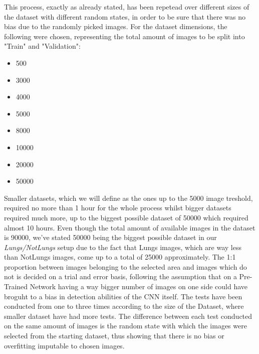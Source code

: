 \documentclass[../main.tex]{subfiles}
\begin{document}

This process, exactly as already stated, has been repetead over different sizes of the dataset with different random states, in order to be sure that there was no bias due to the randomly picked images. For the dataset dimensions, the following were chosen, representing the total amount of images to be split into "Train" and "Validation":
\begin{itemize}
	\item 500
	\item 3000
	\item 4000
	\item 5000
	\item 8000
	\item 10000
	\item 20000
	\item 50000
\end{itemize}

Smaller datasets, which we will define as the ones up to the 5000 image treshold, required no more than 1 hour for the whole process whilst bigger datasets required much more, up to the biggest possible dataset of 50000 which required almost 10 hours. Even though the total amount of available images in the dataset is 90000, we've stated 50000 being the biggest possible dataset in our \textit{Lungs/NotLungs} setup due to the fact that Lungs images, which are way less than NotLungs images, come up to a total of 25000 approximately. The 1:1 proportion between images belonging to the selected area and images which do not is decided on a trial and error basis, following the assumption that on a Pre-Trained Network having a way bigger number of images on one side could have broguht to a bias in detection abilities of the CNN itself. The tests have been conducted from one to three times according to the size of the Dataset, where smaller dataset have had more tests. The difference between each test conducted on the same amount of images is the random state with which the images were selected from the starting dataset, thus showing that there is no bias or overfitting imputable to chosen images.
\end{document}
